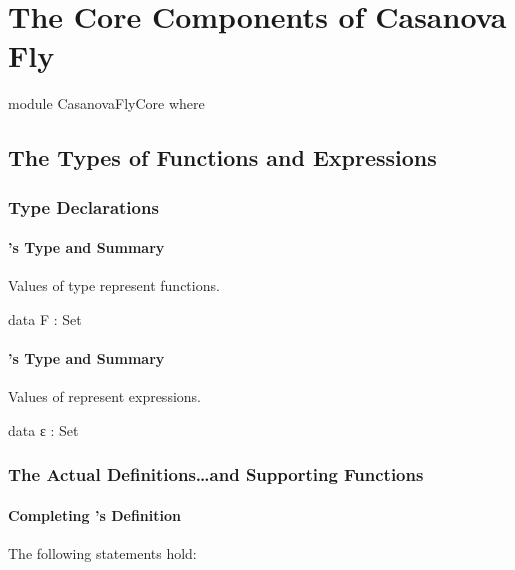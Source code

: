 \documentclass{report}
\begin{document}
\part{The Core Components of Casanova Fly}

\begin{code}
module CasanovaFlyCore where
\end{code}

\chapter{The Types of Functions and Expressions}

\section{Type Declarations}

\subsection{'s Type and Summary}
Values of type  represent functions.

\begin{code}
  data F : Set
\end{code}

\subsection{'s Type and Summary}
Values of  represent expressions.

\begin{code}
  data ε : Set
\end{code}

\section{The Actual Definitions\ldots and Supporting Functions}

\subsection{Completing 's Definition}
The following statements hold:
\end{document}
